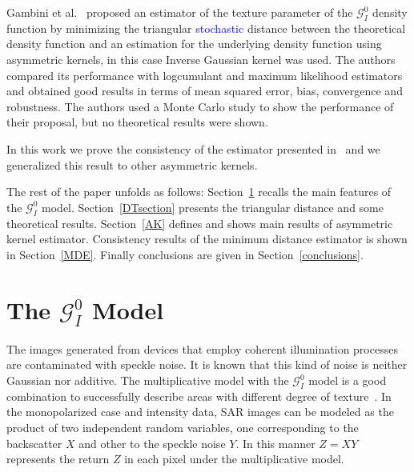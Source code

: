 \documentclass[technote,onecolumn,draftcls,12pt]{IEEEtran}
\numberwithin{equation}{section}
\begin{document}
Gambini et al.~\cite{gambini2015} proposed an estimator of the texture parameter of the $\mathcal{G}_I^0$ density function by  minimizing the triangular \textcolor{blue}{stochastic} distance between the theoretical density function  and an estimation for the underlying density function using asymmetric kernels, in this case Inverse Gaussian kernel was used. The authors compared its performance with logcumulant and maximum likelihood estimators and obtained good results in terms of mean squared error, bias, convergence and robustness. 
The authors used a Monte Carlo study to show the performance of their proposal, but no theoretical results were shown.

In this work we prove the consistency of the estimator presented in~\cite{gambini2015} and we generalized this result to other asymmetric kernels.

The rest of the paper unfolds as follows: 
Section~\ref{sec_SAR} recalls the main features of the $\mathcal{G}_I^0$ model.
Section~\ref{DTsection} presents the triangular distance and some theoretical results. 
Section~\ref{AK} defines and shows main results of asymmetric kernel estimator.
Consistency results of the minimum distance estimator is shown in Section~\ref{MDE}. Finally conclusions are given in Section~\ref{conclusions}.

\section{The $\mathcal{G}_I^0$ Model}
\label{sec_SAR}
The images generated from devices that employ coherent illumination processes are contaminated with speckle noise. It is known that this kind of noise is neither Gaussian nor additive. The multiplicative model with the $\mathcal{G}_I^{0}$ model is a good combination to successfully describe areas with different degree of texture~\cite{Frery97,MejailJacoboFreryBustos:IJRS}. In the monopolarized case and intensity data, SAR images can be modeled as the product of two independent random variables, one corresponding to the backscatter $X$ and other to the speckle noise $Y$. In this manner $Z=X Y  $ represents the return $Z$ in each pixel under the multiplicative model.
\end{document}

